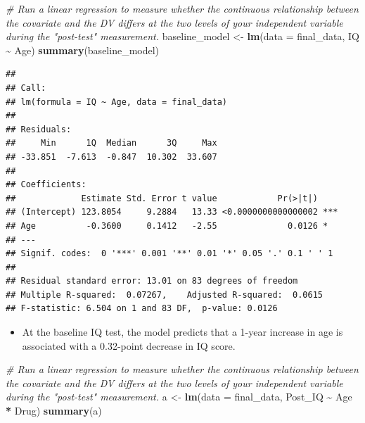 \documentclass[
]{book}
\newenvironment{Shaded}{\begin{snugshade}}{\end{snugshade}}
\newcommand{\AttributeTok}[1]{\textcolor[rgb]{0.13,0.29,0.53}{#1}}
\newcommand{\CommentTok}[1]{\textcolor[rgb]{0.56,0.35,0.01}{\textit{#1}}}
\newcommand{\FunctionTok}[1]{\textcolor[rgb]{0.13,0.29,0.53}{\textbf{#1}}}
\newcommand{\NormalTok}[1]{#1}
\newcommand{\OtherTok}[1]{\textcolor[rgb]{0.56,0.35,0.01}{#1}}
\newcommand{\SpecialCharTok}[1]{\textcolor[rgb]{0.81,0.36,0.00}{\textbf{#1}}}
\providecommand{\tightlist}{%
  \setlength{\itemsep}{0pt}\setlength{\parskip}{0pt}}
\begin{document}
\begin{Shaded}
\begin{Highlighting}[]
\CommentTok{\# Run a linear regression to measure whether the continuous relationship between the covariate and the DV differs at the two levels of your independent variable during the "post{-}test" measurement. }
\NormalTok{baseline\_model }\OtherTok{\textless{}{-}} \FunctionTok{lm}\NormalTok{(}\AttributeTok{data =}\NormalTok{ final\_data, IQ }\SpecialCharTok{\textasciitilde{}}\NormalTok{ Age)}
\FunctionTok{summary}\NormalTok{(baseline\_model)}
\end{Highlighting}
\end{Shaded}

\begin{verbatim}
## 
## Call:
## lm(formula = IQ ~ Age, data = final_data)
## 
## Residuals:
##     Min      1Q  Median      3Q     Max 
## -33.851  -7.613  -0.847  10.302  33.607 
## 
## Coefficients:
##             Estimate Std. Error t value            Pr(>|t|)    
## (Intercept) 123.8054     9.2884   13.33 <0.0000000000000002 ***
## Age          -0.3600     0.1412   -2.55              0.0126 *  
## ---
## Signif. codes:  0 '***' 0.001 '**' 0.01 '*' 0.05 '.' 0.1 ' ' 1
## 
## Residual standard error: 13.01 on 83 degrees of freedom
## Multiple R-squared:  0.07267,    Adjusted R-squared:  0.0615 
## F-statistic: 6.504 on 1 and 83 DF,  p-value: 0.0126
\end{verbatim}

\begin{itemize}
\tightlist
\item
  At the baseline IQ test, the model predicts that a 1-year increase in age is associated with a 0.32-point decrease in IQ score.
\end{itemize}

\begin{Shaded}
\begin{Highlighting}[]
\CommentTok{\# Run a linear regression to measure whether the continuous relationship between the covariate and the DV differs at the two levels of your independent variable during the "post{-}test" measurement. }
\NormalTok{a }\OtherTok{\textless{}{-}} \FunctionTok{lm}\NormalTok{(}\AttributeTok{data =}\NormalTok{ final\_data, Post\_IQ }\SpecialCharTok{\textasciitilde{}}\NormalTok{ Age }\SpecialCharTok{*}\NormalTok{ Drug)}
\FunctionTok{summary}\NormalTok{(a)}
\end{Highlighting}
\end{Shaded}
\end{document}
